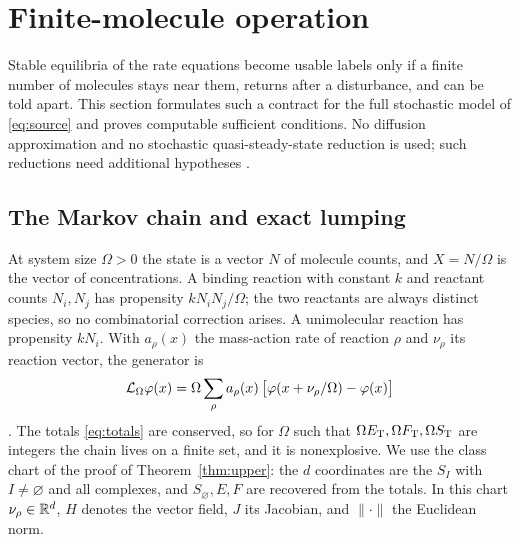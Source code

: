 \section{Finite-molecule operation}\label{sec:finite}
Stable equilibria of the rate equations become usable labels only if a finite number of
molecules stays near them, returns after a disturbance, and can be told apart. This section
formulates such a contract for the full stochastic model of \eqref{eq:source} and proves
computable sufficient conditions. No diffusion approximation and no stochastic
quasi-steady-state reduction is used; such reductions need additional hypotheses
\cite{KimJosicBennett2014}.

\subsection{The Markov chain and exact lumping}
At system size \(\Omega>0\) the state is a vector \(N\) of molecule counts, and
\(X=N/\Omega\) is the vector of concentrations. A binding reaction with constant \(k\) and
reactant counts \(N_i,N_j\) has propensity \(kN_iN_j/\Omega\); the two reactants are always
distinct species, so no combinatorial correction arises. A unimolecular reaction has
propensity \(kN_i\). With \(a_\rho(x)\) the mass-action rate of reaction \(\rho\) and
\(\nu_\rho\) its reaction vector, the generator is
\begin{equation}\label{eq:generator}
 \mathcal L_\Omega\varphi(x)=\Omega\sum_\rho a_\rho(x)\,
 \bigl[\varphi(x+\nu_\rho/\Omega)-\varphi(x)\bigr]
\end{equation}
\cite{AndersonKurtz2015}. The totals \eqref{eq:totals} are conserved, so for \(\Omega\) such
that \(\Omega E_{\mathrm T},\Omega F_{\mathrm T},\Omega S_{\mathrm T}\) are integers the chain lives on a finite set, and it is
nonexplosive. We use the class chart of the proof of Theorem~\ref{thm:upper}: the \(d\)
coordinates are the \(S_I\) with \(I\ne\varnothing\) and all complexes, and
\(S_\varnothing,E,F\) are recovered from the totals. In this chart \(\nu_\rho\in\mathbb R^d\), \(H\)
denotes the vector field, \(J\) its Jacobian, and \(\|\cdot\|\) the Euclidean norm.

